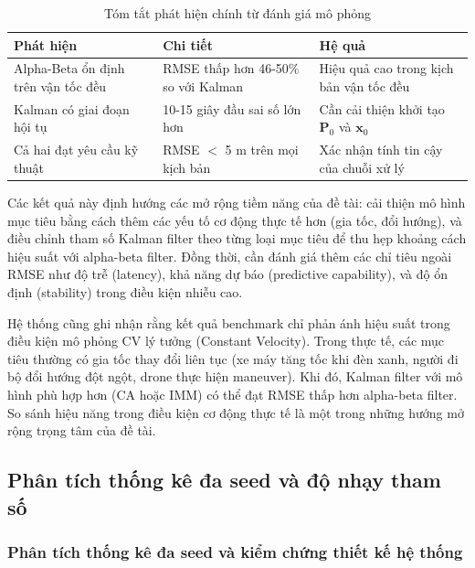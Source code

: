 \begin{table}[H]
\centering
\caption{Tóm tắt phát hiện chính từ đánh giá mô phỏng}
\label{tab:summary-week4}
\begin{tabularx}{\linewidth}{lXX}
\toprule
\textbf{Phát hiện} & \textbf{Chi tiết} & \textbf{Hệ quả} \\
\midrule
Alpha-Beta ổn định trên vận tốc đều & RMSE thấp hơn 46-50\% so với Kalman & Hiệu quả cao trong kịch bản vận tốc đều \\
Kalman có giai đoạn hội tụ & 10-15 giây đầu sai số lớn hơn & Cần cải thiện khởi tạo $\mathbf{P}_0$ và $\mathbf{x}_0$ \\
Cả hai đạt yêu cầu kỹ thuật & RMSE $<$ 5 m trên mọi kịch bản & Xác nhận tính tin cậy của chuỗi xử lý \\
\bottomrule
\end{tabularx}
\end{table}

Các kết quả này định hướng các mở rộng tiềm năng của đề tài: cải thiện mô hình mục tiêu bằng cách thêm các yếu tố cơ động thực tế hơn (gia tốc, đổi hướng), và điều chỉnh tham số Kalman filter theo từng loại mục tiêu để thu hẹp khoảng cách hiệu suất với alpha-beta filter. Đồng thời, cần đánh giá thêm các chỉ tiêu ngoài RMSE như độ trễ (latency), khả năng dự báo (predictive capability), và độ ổn định (stability) trong điều kiện nhiễu cao.

Hệ thống cũng ghi nhận rằng kết quả benchmark chỉ phản ánh hiệu suất trong điều kiện mô phỏng CV lý tưởng (Constant Velocity). Trong thực tế, các mục tiêu thường có gia tốc thay đổi liên tục (xe máy tăng tốc khi đèn xanh, người đi bộ đổi hướng đột ngột, drone thực hiện maneuver). Khi đó, Kalman filter với mô hình phù hợp hơn (CA hoặc IMM) có thể đạt RMSE thấp hơn alpha-beta filter. So sánh hiệu năng trong điều kiện cơ động thực tế là một trong những hướng mở rộng trọng tâm của đề tài.



\subsection{Phân tích thống kê đa seed và độ nhạy tham số}

\subsubsection{Phân tích thống kê đa seed và kiểm chứng thiết kế hệ thống}

